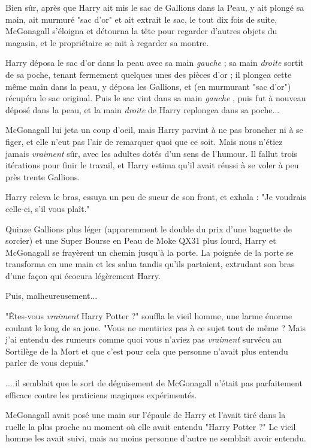 Bien sûr, après que Harry ait mis le sac de Gallions dans la Peau, y ait plongé sa main, ait murmuré "sac d'or" et ait extrait le sac, le tout dix fois de suite, McGonagall s'éloigna et détourna la tête pour regarder d'autres objets du magasin, et le propriétaire se mit à regarder sa montre.

Harry déposa le sac d'or dans la peau avec sa main \emph{gauche}  ; sa main \emph{droite}  sortit de sa poche, tenant fermement quelques unes des pièces d'or ; il plongea cette même main dans la peau, y déposa les Gallions, et (en murmurant "sac d'or") récupéra le sac original. Puis le sac vint dans sa main \emph{gauche} , puis fut à nouveau déposé dans la peau, et la main \emph{droite}  de Harry replongea dans sa poche...

McGonagall lui jeta un coup d'oeil, mais Harry parvint à ne pas broncher ni à se figer, et elle n'eut pas l'air de remarquer quoi que ce soit. Mais nous n'étiez jamais \emph{vraiment}  sûr, avec les adultes dotés d'un sens de l'humour. Il fallut trois itérations pour finir le travail, et Harry estima qu'il avait réussi à se voler à peu près trente Gallions.

Harry releva le bras, essuya un peu de sueur de son front, et exhala : "Je voudrais celle-ci, s'il vous plaît."

Quinze Gallions plus léger (apparemment le double du prix d'une baguette de sorcier) et une Super Bourse en Peau de Moke QX31 plus lourd, Harry et McGonagall se frayèrent un chemin jusqu'à la porte. La poignée de la porte se transforma en une main et les salua tandis qu'ils partaient, extrudant son bras d'une façon qui écoeura légèrement Harry.

Puis, malheureusement...

"Êtes-vous \emph{vraiment}  Harry Potter ?" souffla le vieil homme, une larme énorme coulant le long de sa joue. "Vous ne mentiriez pas à ce sujet tout de même ? Mais j'ai entendu des rumeurs comme quoi vous n'aviez pas \emph{vraiment}  survécu au Sortilège de la Mort et que c'est pour cela que personne n'avait plus entendu parler de vous depuis."

... il semblait que le sort de déguisement de McGonagall n'était pas parfaitement efficace contre les praticiens magiques expérimentés.

McGonagall avait posé une main sur l'épaule de Harry et l'avait tiré dans la ruelle la plus proche au moment où elle avait entendu "Harry Potter ?" Le vieil homme les avait suivi, mais au moins personne d'autre ne semblait avoir entendu.

